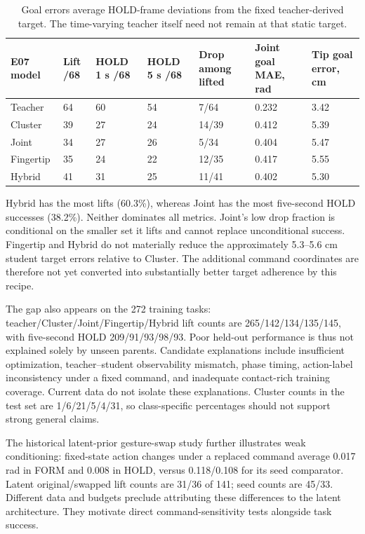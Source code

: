 \documentclass[10pt,twocolumn]{article}
\begin{document}
\begin{table}[t]
\small
\begin{tabularx}{\textwidth}{@{}lXXXXXX@{}}
\toprule
E07 model & Lift /68 & HOLD 1 s /68 & HOLD 5 s /68 & Drop among lifted & Joint goal MAE, rad & Tip goal error, cm \\
\midrule
Teacher & 64 & 60 & 54 & 7/64 & 0.232 & 3.42 \\
Cluster & 39 & 27 & 24 & 14/39 & 0.412 & 5.39 \\
Joint & 34 & 27 & 26 & 5/34 & 0.404 & 5.47 \\
Fingertip & 35 & 24 & 22 & 12/35 & 0.417 & 5.55 \\
Hybrid & 41 & 31 & 25 & 11/41 & 0.402 & 5.30 \\
\bottomrule
\end{tabularx}
\caption{Goal errors average HOLD-frame deviations from the fixed teacher-derived target. The time-varying teacher itself need not remain at that static target.}
\end{table}

Hybrid has the most lifts (60.3\%), whereas Joint has the most five-second HOLD successes (38.2\%). Neither dominates all metrics. Joint's low drop fraction is conditional on the smaller set it lifts and cannot replace unconditional success. Fingertip and Hybrid do not materially reduce the approximately 5.3--5.6 cm student target errors relative to Cluster. The additional command coordinates are therefore not yet converted into substantially better target adherence by this recipe.

The gap also appears on the 272 training tasks: teacher/Cluster/Joint/Fingertip/Hybrid lift counts are 265/142/134/135/145, with five-second HOLD 209/91/93/98/93. Poor held-out performance is thus not explained solely by unseen parents. Candidate explanations include insufficient optimization, teacher--student observability mismatch, phase timing, action-label inconsistency under a fixed command, and inadequate contact-rich training coverage. Current data do not isolate these explanations. Cluster counts in the test set are 1/6/21/5/4/31, so class-specific percentages should not support strong general claims.

The historical latent-prior gesture-swap study further illustrates weak conditioning: fixed-state action changes under a replaced command average 0.017 rad in FORM and 0.008 in HOLD, versus 0.118/0.108 for its seed comparator. Latent original/swapped lift counts are 31/36 of 141; seed counts are 45/33. Different data and budgets preclude attributing these differences to the latent architecture. They motivate direct command-sensitivity tests alongside task success.
\end{document}
